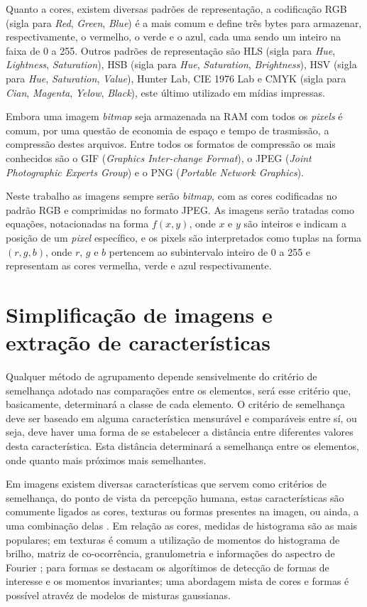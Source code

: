 Quanto a cores, existem diversas padrões de representação, a
codificação RGB (sigla para \textit{Red},
\textit{Green}, \textit{Blue}) é a mais comum e define três bytes para armazenar,
respectivamente, o vermelho, o verde e o azul, cada uma sendo um inteiro na
faixa de 0 a 255. Outros padrões de representação são HLS
(sigla para \textit{Hue}, \textit{Lightness}, \textit{Saturation}),
HSB (sigla para \textit{Hue}, \textit{Saturation}, \textit{Brightness}),
HSV (sigla para \textit{Hue}, \textit{Saturation}, \textit{Value}), Hunter Lab,
CIE 1976 Lab e CMYK (sigla para \textit{Cian}, \textit{Magenta},
\textit{Yelow}, \textit{Black}), este último utilizado em mídias impressas.

Embora uma imagem \textit{bitmap} seja armazenada na RAM com todos os \textit{pixels} é comum,
por uma questão de economia de espaço e tempo de trasmissão, a compressão destes
arquivos. Entre todos os formatos de compressão os mais conhecidos são o GIF
(\textit{Graphics Inter-change Format}), o JPEG
(\textit{Joint Photographic Experts Group}) e
o PNG (\textit{Portable Network Graphics}).

Neste trabalho as imagens sempre serão \textit{bitmap}, com as cores codificadas
no padrão RGB e comprimidas no formato JPEG. As imagens serão tratadas como
equações, notacionadas na forma $ f(x,y) $, onde $ x $ e $ y $ são inteiros e indicam a
posição de um \textit{pixel} específico, e os pixels são interpretados como tuplas na
forma $ (r, g, b) $, onde $ r $, $ g $ e $ b $ pertencem ao subintervalo inteiro
de 0 a 255 e representam as cores vermelha, verde e azul respectivamente.

\section{Simplificação de imagens e extração de características}\label{sec:simplificacao_img}

Qualquer método de agrupamento depende sensivelmente do critério de semelhança
adotado nas comparações entre os elementos, será esse critério que, basicamente,
determinará a classe de cada elemento. O critério de semelhança deve ser baseado
em alguma característica mensurável e comparáveis entre sí, ou seja, deve haver
uma forma de se estabelecer a distância entre diferentes valores desta característica.
Esta distância determinará a semelhança entre os elementos, onde
quanto mais próximos mais semelhantes.

Em imagens existem diversas características que servem como critérios de
semelhança, do ponto de vista da percepção humana, estas características são
comumente ligados as cores, texturas ou formas presentes na imagen, ou ainda,
a uma combinação delas \cite{UnsupervisedImageSet}. Em relação as cores, medidas
de histograma são as mais
populares; em texturas é comum a utilização de momentos do histograma de brilho,
matriz de co-ocorrência, granulometria e informações do aspectro de Fourier
\cite{Tecnicas};
para formas se destacam os algorítimos de detecção de formas de interesse
\cite{WebScaleImageClustering} e os
momentos invariantes; uma abordagem mista de cores e formas é possível atravéz
de modelos de misturas gaussianas.

